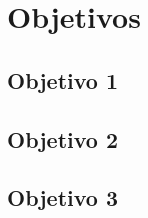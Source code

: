 \chapter{Objetivos}
\label{sec:Objetivos}

\section{Objetivo 1}
\label{subsec:obj-1}

\section{Objetivo 2}
\label{subsec:obj-2}

\section{Objetivo 3}
\label{subsec:obj-3}
